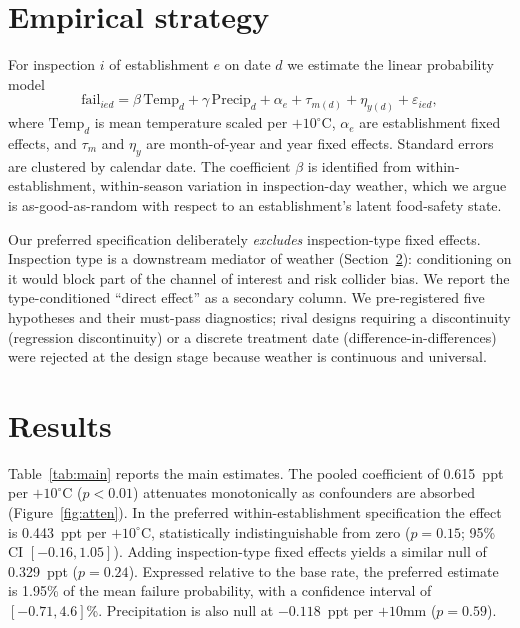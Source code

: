 \documentclass[11pt]{article}
\begin{document}
\section{Empirical strategy}
For inspection $i$ of establishment $e$ on date $d$ we estimate the linear probability model
\begin{equation}
\mathrm{fail}_{ied} = \beta\,\mathrm{Temp}_{d} + \gamma\,\mathrm{Precip}_{d}
+ \alpha_e + \tau_{m(d)} + \eta_{y(d)} + \varepsilon_{ied},
\end{equation}
where $\mathrm{Temp}_d$ is mean temperature scaled per $+10^\circ$C, $\alpha_e$ are
establishment fixed effects, and $\tau_{m}$ and $\eta_{y}$ are month-of-year and year fixed
effects. Standard errors are clustered by calendar date. The coefficient $\beta$ is
identified from within-establishment, within-season variation in inspection-day weather,
which we argue is as-good-as-random with respect to an establishment's latent food-safety
state.

Our preferred specification deliberately \emph{excludes} inspection-type fixed effects.
Inspection type is a downstream mediator of weather (Section~\ref{sec:results}): conditioning
on it would block part of the channel of interest and risk collider bias. We report the
type-conditioned ``direct effect'' as a secondary column. We pre-registered five hypotheses
and their must-pass diagnostics; rival designs requiring a discontinuity (regression
discontinuity) or a discrete treatment date (difference-in-differences) were rejected at the
design stage because weather is continuous and universal.

\section{Results}\label{sec:results}
Table~\ref{tab:main} reports the main estimates. The pooled coefficient of 0.615~ppt per
$+10^\circ$C ($p<0.01$) attenuates monotonically as confounders are absorbed
(Figure~\ref{fig:atten}). In the preferred within-establishment specification the effect is
0.443~ppt per $+10^\circ$C, statistically indistinguishable from zero
($p=0.15$; 95\% CI $[-0.16, 1.05]$). Adding inspection-type fixed effects yields a similar
null of 0.329~ppt ($p=0.24$). Expressed relative to the base rate, the preferred estimate is
1.95\% of the mean failure probability, with a confidence interval of $[-0.71, 4.6]$\%.
Precipitation is also null at $-0.118$~ppt per $+10$mm ($p=0.59$).

\begin{table}[H]\centering
\caption{Inspection failure and inspection-day weather: main estimates}
\label{tab:main}

\end{table}
\end{document}

